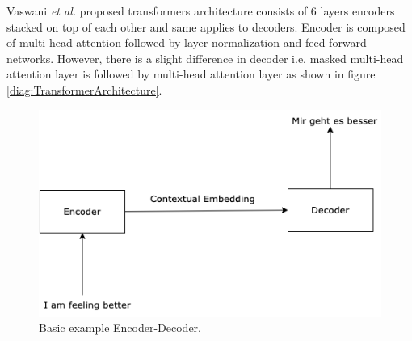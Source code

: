 \documentclass[%
	BCOR=8mm, %
	DIV=12,
	toc=bibliography, %
	toc=listof, %
	oneside, %
	egregdoesnotlikesansseriftitles, %
	]{scrbook}
\begin{document}
 Vaswani \textit{et al.} \cite{vaswani_attention_2017} proposed transformers architecture consists of  6 layers encoders stacked on top of each other and same applies to decoders. Encoder is composed of multi-head attention followed by layer normalization and feed forward networks. However, there is a slight difference in decoder i.e. masked multi-head attention layer is followed by multi-head attention layer as shown in figure  \ref{diag:TransformerArchitecture}.
\begin{figure}[H]
    \centering
    \includegraphics[width=.55\textwidth]{img/encoderDecoder.png}
    \caption[Basic example of encoder-decoder]{Basic example Encoder-Decoder.}
    \label{diag:EncoderDecoder}
\end{figure}
\end{document}

